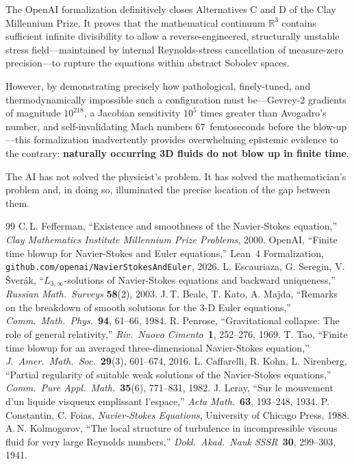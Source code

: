 \documentclass[11pt,a4paper]{article}
\begin{document}
The OpenAI formalization definitively closes Alternatives C and D of the Clay Millennium Prize.
It proves that the mathematical continuum $\mathbb{R}^3$ contains sufficient infinite divisibility
to allow a reverse-engineered, structurally unstable stress field---maintained by internal
Reynolds-stress cancellation of measure-zero precision---to rupture the equations within abstract
Sobolev spaces.

However, by demonstrating precisely how pathological, finely-tuned, and thermodynamically
impossible such a configuration must be---Gevrey-2 gradients of magnitude $10^{218}$, a Jacobian
sensitivity $10^5$ times greater than Avogadro's number, and self-invalidating Mach numbers
67~femtoseconds before the blow-up---this formalization inadvertently provides overwhelming
epistemic evidence to the contrary: \textbf{naturally occurring 3D fluids do not blow up in
finite time}.

The AI has not solved the physicist's problem. It has solved the mathematician's problem and, in
doing so, illuminated the precise location of the gap between them.

\begin{thebibliography}{99}
  C.\,L. Fefferman, ``Existence and smoothness of the Navier-Stokes equation,''
  \emph{Clay Mathematics Institute Millennium Prize Problems}, 2000.
  OpenAI, ``Finite time blowup for Navier-Stokes and Euler equations,''
  Lean~4 Formalization, \texttt{github.com/openai/NavierStokesAndEuler}, 2026.
  L. Escauriaza, G. Seregin, V. \v{S}ver\'{a}k,
  ``$L_{3,\infty}$-solutions of Navier-Stokes equations and backward uniqueness,''
  \emph{Russian Math.\ Surveys} \textbf{58}(2), 2003.
  J.\,T. Beale, T. Kato, A. Majda,
  ``Remarks on the breakdown of smooth solutions for the 3-D Euler equations,''
  \emph{Comm.\ Math.\ Phys.}\ \textbf{94}, 61--66, 1984.
  R. Penrose,
  ``Gravitational collapse: The role of general relativity,''
  \emph{Riv.\ Nuovo Cimento}\ \textbf{1}, 252--276, 1969.
  T. Tao,
  ``Finite time blowup for an averaged three-dimensional Navier-Stokes equation,''
  \emph{J.\ Amer.\ Math.\ Soc.}\ \textbf{29}(3), 601--674, 2016.
  L. Caffarelli, R. Kohn, L. Nirenberg,
  ``Partial regularity of suitable weak solutions of the Navier-Stokes equations,''
  \emph{Comm.\ Pure Appl.\ Math.}\ \textbf{35}(6), 771--831, 1982.
  J. Leray,
  ``Sur le mouvement d'un liquide visqueux emplissant l'espace,''
  \emph{Acta Math.}\ \textbf{63}, 193--248, 1934.
  P. Constantin, C. Foias,
  \emph{Navier-Stokes Equations}, University of Chicago Press, 1988.
  A.\,N. Kolmogorov,
  ``The local structure of turbulence in incompressible viscous fluid for very large Reynolds
  numbers,'' \emph{Dokl.\ Akad.\ Nauk SSSR}\ \textbf{30}, 299--303, 1941.
\end{thebibliography}
\end{document}
